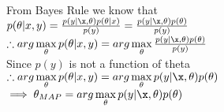 \begin{answer}\\
From Bayes Rule we know that\\
$p(\theta|x,y)=\frac{p(y|\x,\theta)p(\theta|x)}{p(y)}=\frac{p(y|\x,\theta)p(\theta)}{p(y)}$\\
$\therefore arg \max\limits_{\theta} p(\theta|x,y)=arg \max\limits_{\theta}\frac{p(y|\x,\theta)p(\theta)}{p(y)}$\\
Since $p(y)$ is not a function of theta\\
$\therefore arg \max\limits_{\theta} p(\theta|x,y)=arg \max\limits_{\theta} p(y|\x,\theta)p(\theta)$\\
$\implies \theta_{MAP}=arg \max\limits_{\theta} p(y|\x,\theta)p(\theta)$\\
\end{answer}
